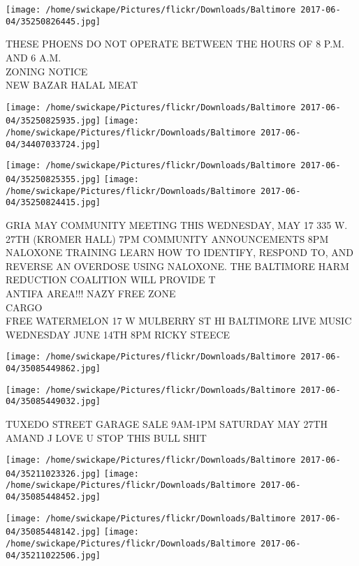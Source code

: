 \documentclass[10pt,letterpaper]{article}
\begin{document}
\vspace{0.25in}
\texttt{[image: /home/swickape/Pictures/flickr/Downloads/Baltimore 2017-06-04/35250826445.jpg]}

THESE PHOENS DO NOT OPERATE BETWEEN THE HOURS OF 8 P.M. AND 6 A.M.\\
ZONING NOTICE\\
NEW BAZAR HALAL MEAT\\
\pagebreak

\texttt{[image: /home/swickape/Pictures/flickr/Downloads/Baltimore 2017-06-04/35250825935.jpg]}
\texttt{[image: /home/swickape/Pictures/flickr/Downloads/Baltimore 2017-06-04/34407033724.jpg]}

\texttt{[image: /home/swickape/Pictures/flickr/Downloads/Baltimore 2017-06-04/35250825355.jpg]}
\texttt{[image: /home/swickape/Pictures/flickr/Downloads/Baltimore 2017-06-04/35250824415.jpg]}

GRIA MAY COMMUNITY MEETING THIS WEDNESDAY, MAY 17 335 W. 27TH (KROMER HALL) 7PM COMMUNITY ANNOUNCEMENTS 8PM NALOXONE TRAINING LEARN HOW TO IDENTIFY, RESPOND TO, AND REVERSE AN OVERDOSE USING NALOXONE.  THE BALTIMORE HARM REDUCTION COALITION WILL PROVIDE T\\
ANTIFA AREA!!! NAZY FREE ZONE\\
CARGO\\
FREE WATERMELON 17 W MULBERRY ST HI BALTIMORE LIVE MUSIC WEDNESDAY JUNE 14TH 8PM RICKY STEECE\\
\pagebreak

\texttt{[image: /home/swickape/Pictures/flickr/Downloads/Baltimore 2017-06-04/35085449862.jpg]}

\vspace{0.25in}
\texttt{[image: /home/swickape/Pictures/flickr/Downloads/Baltimore 2017-06-04/35085449032.jpg]}

TUXEDO STREET GARAGE SALE 9AM{-}1PM SATURDAY MAY 27TH\\
AMAND J LOVE U STOP THIS BULL SHIT\\
\pagebreak

\texttt{[image: /home/swickape/Pictures/flickr/Downloads/Baltimore 2017-06-04/35211023326.jpg]}
\texttt{[image: /home/swickape/Pictures/flickr/Downloads/Baltimore 2017-06-04/35085448452.jpg]}

\texttt{[image: /home/swickape/Pictures/flickr/Downloads/Baltimore 2017-06-04/35085448142.jpg]}
\texttt{[image: /home/swickape/Pictures/flickr/Downloads/Baltimore 2017-06-04/35211022506.jpg]}
\end{document}

